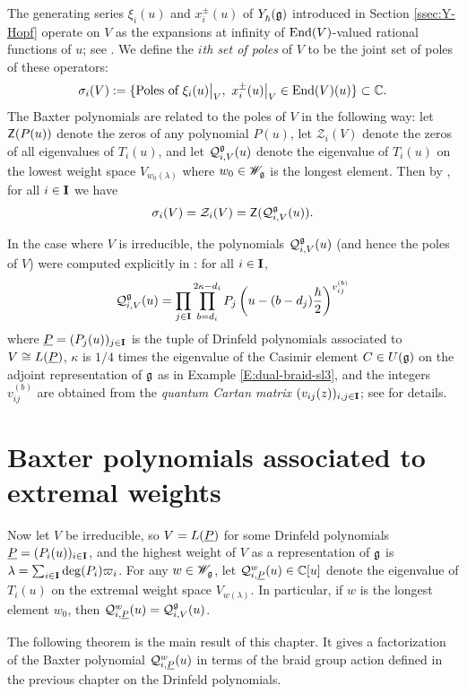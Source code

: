 The generating series $\xi_i(u)$ and $x^\pm_i(u)$ of $Y_\hbar^{}(\mathfrak{g})$ introduced in Section \ref{ssec:Y-Hopf} operate on $V$ as the expansions at infinity of $\operatorname{End}(V)$-valued rational functions of $u$; see \cite[Prop. 3.6]{gautam_yangians_2016}.
We define the \emph{$i$th set of poles} of $V$ to be the joint set of poles of these operators:
\[\sigma_i(V) := \{\text{Poles of } \xi_i(u)\big|_V,\ x^\pm_i(u)\big|_V \in\operatorname{End}(V)(u)\} \subset\mathbb{C}.\]
The Baxter polynomials are related to the poles of $V$ in the following way: let $\mathsf{Z}(P(u))$ denote the zeros of any polynomial $P(u)$, let $\mathcal{Z}_i(V)$ denote the zeros of all eigenvalues of $T_i(u)$, and let $\mathcal{Q}_{i,V}^{\mathfrak{g}}(u)$ denote the eigenvalue of $T_i(u)$ on the lowest weight space $V_{w_0(\lambda)}$ where $w_0\in\mathscr{W}_{\mathfrak{g}}$ is the longest element.
Then by \cite[Thm. 4.4]{gautam_poles_2023}, for all $i\in\mathbf{I}$ we have
\[\sigma_i(V) = \mathcal{Z}_i(V) = \mathsf{Z}(\mathcal{Q}_{i,V}^{\mathfrak{g}}(u)).\]

In the case where $V$ is irreducible, the polynomials $\mathcal{Q}_{i,V}^{\mathfrak{g}}(u)$ (and hence the poles of $V$) were computed explicitly in \cite[Thm. 5.2]{gautam_poles_2023}: for all $i\in\mathbf{I}$,
\[\mathcal{Q}_{i,V}^{\mathfrak{g}}(u) = \prod_{j\in\mathbf{I}}\prod_{b=d_i}^{2\kappa-d_i} P_j\left(u-(b-d_j)\frac{\hbar}{2}\right)^{v_{ij}^{(b)}}\]
where $\underline{P}=(P_j(u))_{j\in\mathbf{I}}$ is the tuple of Drinfeld polynomials associated to $V\cong L(\underline{P})$, $\kappa$ is $1/4$ times the eigenvalue of the Casimir element $C\in U(\mathfrak{g})$ on the adjoint representation of $\mathfrak{g}$ as in Example \ref{E:dual-braid-sl3}, and the integers $v_{ij}^{(b)}$ are obtained from the \emph{quantum Cartan matrix} $(v_{ij}(z))_{i,j\in\mathbf{I}}$; see \cite[\S 5.2]{friesen_braid_2024} for details.


\section{Baxter polynomials associated to extremal weights}\label{sec:baxter-extremal}

Now let $V$ be irreducible, so $V=L(\underline{P})$ for some Drinfeld polynomials $\underline{P}=(P_i(u))_{i\in\mathbf{I}}$, and the highest weight of $V$ as a representation of $\mathfrak{g}$ is $\lambda = \sum_{i\in\mathbf{I}}\deg(P_i)\varpi_i$.
For any $w\in\mathscr{W}_{\mathfrak{g}}$, let $\mathcal{Q}_{i,\underline{P}}^w(u)\in\mathbb{C}[u]$ denote the eigenvalue of $T_i(u)$ on the extremal weight space $V_{w(\lambda)}$.
In particular, if $w$ is the longest element $w_0$, then $\mathcal{Q}_{i,\underline{P}}^w(u) = \mathcal{Q}_{i,V}^{\mathfrak{g}}(u)$.

The following theorem is the main result of this chapter.
It gives a factorization of the Baxter polynomial $\mathcal{Q}_{i,\underline{P}}^w(u)$ in terms of the braid group action defined in the previous chapter on the Drinfeld polynomials.

